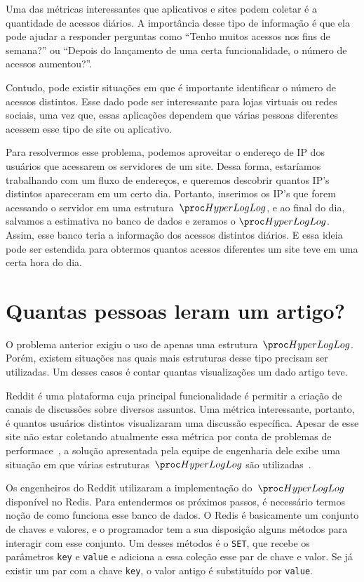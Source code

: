 Uma das métricas interessantes que aplicativos e sites podem coletar é a quantidade de acessos diários. A importância 
desse tipo de informação é que ela pode ajudar a responder perguntas como ``Tenho muitos acessos nos fins de semana?'' 
ou ``Depois do lançamento de uma certa funcionalidade, o número de acessos aumentou?''.

Contudo, pode existir situações em que é importante identificar o número de acessos distintos. Esse dado pode ser 
interessante para lojas virtuais ou redes sociais, uma vez que, essas aplicações dependem que várias pessoas diferentes
acessem esse tipo de site ou aplicativo.

Para resolvermos esse problema, podemos aproveitar o endereço de IP dos usuários que acessarem os servidores de um site.
Dessa forma, estaríamos trabalhando com um fluxo de endereços, e queremos descobrir quantos IP's distintos apareceram em
um certo dia. Portanto, inserimos os IP's que forem acessando o servidor em uma estrutura~$\HLOG$, e ao final do dia, 
salvamos a estimativa no banco de dados e zeramos o $\HLOG$. Assim, esse banco teria a informação dos acessos distintos 
diários. E essa ideia pode ser estendida para obtermos quantos acessos diferentes um site teve em uma certa hora do dia.

\section{Quantas pessoas leram um artigo?}

O problema anterior exigiu o uso de apenas uma estrutura~$\HLOG$. Porém, existem situações nas quais mais estruturas 
desse tipo precisam ser utilizadas. Um desses casos é contar quantas visualizações um dado artigo teve.

Reddit é uma plataforma cuja principal funcionalidade é permitir a criação de canais de discussões sobre diversos 
assuntos. Uma métrica interessante, portanto, é quantos usuários distintos visualizaram uma discussão específica. Apesar
de esse site não estar coletando atualmente essa métrica por conta de problemas de performace~\citep{RedditDisabled}, a 
solução apresentada pela equipe de engenharia dele exibe uma situação em que várias estruturas~$\HLOG$ são 
utilizadas~\citep{Reddit}.

Os engenheiros do Reddit utilizaram a implementação do~$\HLOG$ disponível no Redis. Para entendermos os próximos passos,
é necessário termos noção de como funciona esse banco de dados. O Redis é basicamente um conjunto de chaves e valores, e
o programador tem a sua disposição alguns métodos para interagir com esse conjunto. Um desses métodos é o \texttt{SET},
que recebe os parâmetros \texttt{key} e \texttt{value} e adiciona a essa coleção esse par de chave e valor. Se já 
existir um par com a chave \texttt{key}, o valor antigo é substituído por \texttt{value}.

